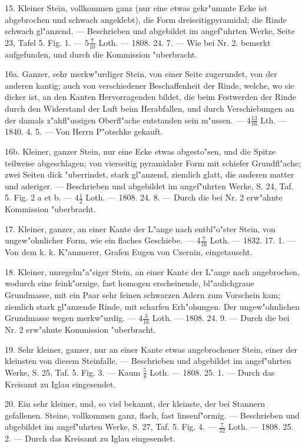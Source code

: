 \documentclass[a4paper, 11pt, oneside, polutonikogreek, german]{article}
\begin{document}
15. Kleiner Stein, vollkommen ganz (nur eine etwas gekr"ummte Ecke ist abgebrochen und schwach angeklebt), die Form dreiseitigpyramidal; die Rinde schwach gl"anzend. --- Beschrieben und abgebildet im angef"uhrten Werke, Seite 23, Tafel 5. Fig. 1. --- $\mathfrak{5\frac{7}{10}}$ Loth. --- 1808. 24. 7. --- Wie bei Nr. 2. bemerkt aufgefunden, und durch die Kommission "uberbracht.

16a. Ganzer, sehr merkw"urdiger Stein, von einer Seite zugerundet, von der anderen kantig; auch von verschiedener Beschaffenheit der Rinde, welche, wo sie dicker ist, an den Kanten Hervorragenden bildet, die beim Festwerden der Rinde durch den Widerstand der Luft beim Herabfallen, und durch Verschiebungen an der damals z"ahfl"ussigen Oberfl"ache entstanden sein m"ussen. --- $\mathfrak{4\frac{13}{16}}$ Lth. --- 1840. 4. 5. --- Von Herrn P"otschke gekauft. 

16b. Kleiner, ganzer Stein, nur eine Ecke etwas abgesto"sen, und die Spitze teilweise abgeschlagen; von vierseitig pyramidaler Form mit schiefer Grundfl"ache; zwei Seiten dick "uberrindet, stark gl"anzend, ziemlich glatt, die anderen matter und aderiger. --- Beschrieben und abgebildet im angef"uhrten Werke, S. 24, Taf. 5. Fig. 2 a et b. --- $\mathfrak{4\frac{1}{2}}$ Loth. --- 1808. 24. 8. --- Durch die bei Nr. 2 erw"ahnte Kommission "uberbracht.

17. Kleiner, ganzer, an einer Kante der L"ange nach entbl"o"ster Stein, von ungew"ohnlicher Form, wie ein flaches Geschiebe. --- $\mathfrak{4\frac{7}{16}}$ Loth. --- 1832. 17. 1. --- Von dem k. k. K"ammerer, Grafen Eugen von Czernin, eingetauscht.

18. Kleiner, unregelm"a"siger Stein, an einer Kante der L"ange nach angebrochen, wodurch eine feink"ornige, fast homogen erscheinende, bl"aulichgraue Grundmasse, mit ein Paar sehr feinen schwarzen Adern zum Vorschein kam; ziemlich stark gl"anzende Rinde, mit scharfen Erh"ohungen. Der ungew"ohnlichen Grundmasse wegen merkw"urdig. --- $\mathfrak{4\frac{3}{16}}$ Loth. --- 1808. 24. 9. --- Durch die bei Nr. 2 erw"ahnte Kommission "uberbracht.

19. Sehr kleiner, ganzer, nur an einer Kante etwas angebrochener Stein, einer der kleinsten von diesem Steinfalle. --- Beschrieben und abgebildet im angef"uhrten Werke, S. 25, Taf. 5. Fig. 3. --- Kaum $\mathfrak{\frac{5}{8}}$ Loth. --- 1808. 25. 1. --- Durch das Kreisamt zu Iglau eingesendet.

20. Ein sehr kleiner, und, so viel bekannt, der kleinste, der bei Stannern gefallenen. Steine, vollkommen ganz, flach, fast linsenf"ormig. --- Beschrieben und abgebildet im angef"uhrten Werke, S. 27, Taf. 5. Fig. 4. --- $\mathfrak{\frac{7}{32}}$ Loth. --- 1808. 25. 2. --- Durch das Kreisamt zu Iglau eingesendet.
\end{document}
